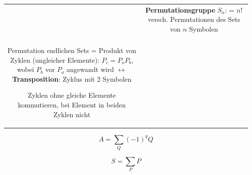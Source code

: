 \documentclass[12pt,a4paper]{article}
\begin{document}
\begin{tabular}{cc}
 &
\parbox{0.6\linewidth}{
\textbf{Permutationsgruppe} $S_n$: \\
= $n!$ versch. Permutationen des Sets von $n$ Symbolen
} \\ \\

\parbox{0.6\linewidth}{
Permutation endlichen Sets = Produkt von Zyklen (ungleicher Elemente):\\
$P_c = P_a P_b$, wobei $P_b$ vor $P_a$ angewandt wird  \\
$\leftrightarrow$ \textbf{Transposition}: Zyklus mit 2 Symbolen


Zyklen ohne gleiche Elemente kommutieren, bei Element in beiden Zyklen nicht
} 

\\
\end{tabular}



$$  A =  \sum _Q (-1)^q Q$$



$$ S = \sum _P P$$
\end{document}

